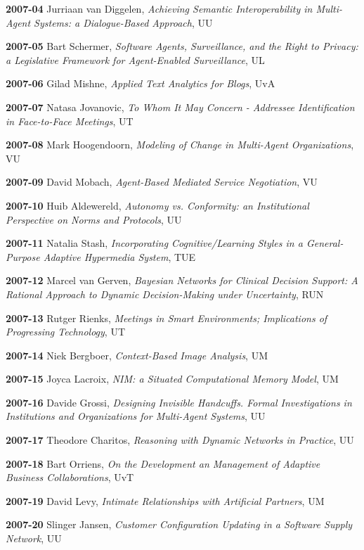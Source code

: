 \begin{multicols}{2}
\textbf{2007-04}   Jurriaan van Diggelen, \textit{Achieving Semantic Interoperability in Multi-Agent Systems: a Dialogue-Based Approach}, UU

\textbf{2007-05}   Bart Schermer, \textit{Software Agents, Surveillance, and the Right to Privacy: a  Legislative Framework for Agent-Enabled Surveillance}, UL

\textbf{2007-06}   Gilad Mishne, \textit{Applied Text Analytics for Blogs}, UvA

\textbf{2007-07}   Natasa Jovanovic, \textit{To Whom It May Concern - Addressee Identification in Face-to-Face Meetings}, UT

\textbf{2007-08}   Mark Hoogendoorn, \textit{Modeling of Change in Multi-Agent Organizations}, VU

\textbf{2007-09}   David Mobach, \textit{Agent-Based Mediated Service Negotiation}, VU

\textbf{2007-10}   Huib Aldewereld, \textit{Autonomy vs. Conformity: an Institutional Perspective on Norms and Protocols}, UU

\textbf{2007-11}   Natalia Stash, \textit{Incorporating Cognitive/Learning Styles in a General-Purpose Adaptive Hypermedia System}, TUE

\textbf{2007-12}   Marcel van Gerven, \textit{Bayesian Networks for Clinical Decision Support: A Rational Approach to Dynamic Decision-Making under Uncertainty}, RUN

\textbf{2007-13}   Rutger Rienks, \textit{Meetings in Smart Environments; Implications of Progressing Technology}, UT

\textbf{2007-14}   Niek Bergboer, \textit{Context-Based Image Analysis}, UM

\textbf{2007-15}   Joyca Lacroix, \textit{NIM: a Situated Computational Memory Model}, UM

\textbf{2007-16}   Davide Grossi, \textit{Designing Invisible Handcuffs. Formal Investigations in Institutions and Organizations for Multi-Agent Systems}, UU

\textbf{2007-17}   Theodore Charitos, \textit{Reasoning with Dynamic Networks in Practice}, UU
  
\textbf{2007-18}   Bart Orriens, \textit{On the Development an Management of Adaptive Business Collaborations}, UvT

\textbf{2007-19}   David Levy, \textit{Intimate Relationships with Artificial Partners}, UM

\textbf{2007-20}   Slinger Jansen, \textit{Customer Configuration Updating in a Software Supply Network}, UU


\end{multicols}
